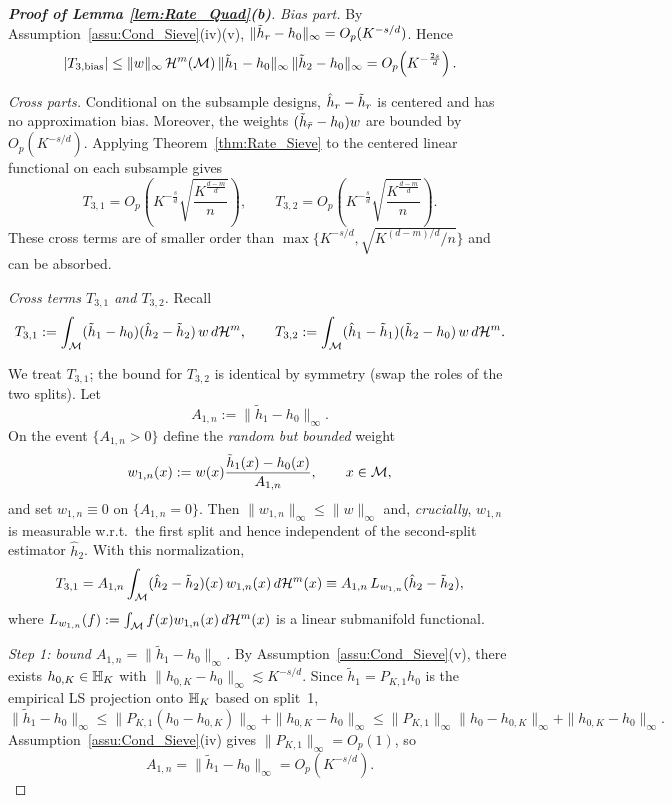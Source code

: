 \documentclass[12pt,american]{article}
\newcommand{\cH}{\mathcal{H}}
\theoremstyle{definition}
\theoremstyle{plain}
\theoremstyle{definition}
\theoremstyle{plain}
\theoremstyle{plain}
\theoremstyle{plain}
\theoremstyle{plain}
\theoremstyle{plain}
\begin{document}
\begin{proof}[\textbf{Proof of Lemma \ref{lem:Rate_Quad}(b)}]
\emph{Bias part.} By Assumption~\ref{assu:Cond_Sieve}(iv)(v),
$\|\tilde{h}_r-h_0\|_{\infty}=O_p(K^{-s/d})$.
Hence
\[
|T_{3,\mathrm{bias}}|
\le \|w\|_{\infty}\,\cH^{m}(\cM)\,\|\td h_1-h_0\|_{\infty}\,\|\td h_2-h_0\|_{\infty}
=O_p\!\left(K^{-\frac{2s}{d}}\right).
\]

\emph{Cross parts.}
Conditional on the subsample designs, $\hat h_r-\tilde{h}_r$ is centered and has no approximation bias.
Moreover, the weights $(\tilde{h}_{\bar r}-h_0)w$ are bounded by $O_p(K^{-s/d})$.
Applying Theorem~\ref{thm:Rate_Sieve} to the centered linear functional on each subsample gives
\[
T_{3,1}=O_p\!\left(K^{-\frac{s}{d}}\sqrt{\frac{K^{\frac{d-m}{d}}}{n}}\right),
\qquad
T_{3,2}=O_p\!\left(K^{-\frac{s}{d}}\sqrt{\frac{K^{\frac{d-m}{d}}}{n}}\right).
\]
These cross terms are of smaller order than $\max\{K^{-s/d},\sqrt{K^{(d-m)/d}/n}\}$ and can be absorbed.

\smallskip
\noindent\emph{Cross terms $T_{3,1}$ and $T_{3,2}$.}
Recall
\[
T_{3,1}:=\int_{\cM}(\tilde h_1-h_0)(\hat h_2-\tilde h_2)\,w\,d\cH^m,
\qquad
T_{3,2}:=\int_{\cM}(\hat h_1-\tilde h_1)(\tilde h_2-h_0)\,w\,d\cH^m .
\]

We treat $T_{3,1}$; the bound for $T_{3,2}$ is identical by symmetry (swap the roles of the two splits).
Let
\[
A_{1,n}:=\|\tilde h_1-h_0\|_\infty .
\]
On the event $\{A_{1,n}>0\}$ define the \emph{random but bounded} weight
\[
w_{1,n}(x):=w(x)\frac{\tilde h_1(x)-h_0(x)}{A_{1,n}},
\qquad x\in\mathcal{M},
\]
and set $w_{1,n}\equiv 0$ on $\{A_{1,n}=0\}$.
Then $\|w_{1,n}\|_\infty\le \|w\|_\infty$ and, \emph{crucially}, $w_{1,n}$ is measurable w.r.t.\ the first split and hence independent of the second-split estimator $\hat h_2$.
With this normalization,
\begin{equation}\label{eq:T31_normalized}
T_{3,1}=A_{1,n}\int_{\cM}(\hat h_2-\tilde h_2)(x)\,w_{1,n}(x)\,d\cH^m(x)
\equiv A_{1,n}\,L_{w_{1,n}}(\hat h_2-\tilde h_2),
\end{equation}
where $L_{w_{1,n}}(f):=\int_{\cM} f(x) w_{1,n}(x)\,d\cH^m(x)$ is a linear submanifold functional.

\smallskip
\noindent\emph{Step 1: bound $A_{1,n}=\|\tilde h_1-h_0\|_\infty$.}
By Assumption~\ref{assu:Cond_Sieve}(v), there exists $h_{0,K}\in\mathbb{H}_K$ with $\|h_{0,K}-h_0\|_\infty\lesssim K^{-s/d}$.
Since $\tilde h_1=P_{K,1}h_0$ is the empirical LS projection onto $\mathbb{H}_K$ based on split~1,
\[
\|\tilde h_1-h_0\|_\infty
\le \|P_{K,1}(h_0-h_{0,K})\|_\infty+\|h_{0,K}-h_0\|_\infty
\le \|P_{K,1}\|_\infty\|h_0-h_{0,K}\|_\infty+\|h_{0,K}-h_0\|_\infty.
\]
Assumption~\ref{assu:Cond_Sieve}(iv) gives $\|P_{K,1}\|_\infty=O_p(1)$, so
\begin{equation}\label{eq:A1n_rate}
A_{1,n}=\|\tilde h_1-h_0\|_\infty=O_p(K^{-s/d}).
\end{equation}


\end{proof}
\end{document}
